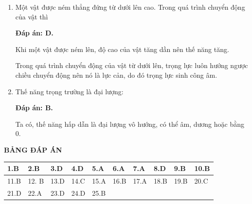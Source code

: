 \begin{enumerate}[label=\bfseries Câu \arabic*:]
{		Động năng là năng lượng vật có được do chuyển động.
	}
		\item {}
	
	
	{Một vật được ném thẳng đứng từ dưới lên cao. Trong quá trình chuyển động của vật thì
	}
	
	\hideall
	{	
		\textbf{Đáp án: D.}
		
		Khi một vật được ném lên, độ cao của vật tăng dần nên thế năng tăng.
		
		Trong quá trình chuyển động của vật từ dưới lên, trọng lực luôn hướng ngược chiều chuyển động nên nó là lực cản, do đó trọng lực sinh công âm.
	}
		\item {}
	
	
	{Thế năng trọng trường là đại lượng: 
	}
	
	\hideall
	{	
		\textbf{Đáp án: B.}
		
		Ta có, thế năng hấp dẫn là đại lượng vô hướng, có thể âm, dương hoặc bằng 0.
	}
\end{enumerate}
\hideall
{
	\begin{center}
		\textbf{BẢNG ĐÁP ÁN}
	\end{center}
	\begin{center}
		\begin{tabular}{|m{2.8em}|m{2.8em}|m{2.8em}|m{2.8em}|m{2.8em}|m{2.8em}|m{2.8em}|m{2.8em}|m{2.8em}|m{2.8em}|}
			\hline
			1.B  & 2.B  & 3.D  & 4.D  & 5.A  & 6.A  & 7.A  & 8.D  & 9.B  & 10.B  \\
			\hline
			11.B  & 12. B  & 13.D  & 14.C  & 15.A  & 16.B  & 17.A  & 18.B  & 19.B  & 20.C  \\
			\hline
			21.D  & 22.A  & 23.D  & 24.D  & 25.B  &   &   &   &   &  \\
			\hline
		\end{tabular}
	\end{center}
}
